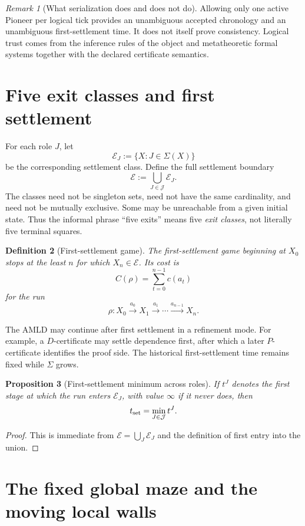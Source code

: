 \documentclass[11pt]{article}
\newtheorem{definition}{Definition}[section]
\newtheorem{proposition}[definition]{Proposition}
\theoremstyle{remark}
\newtheorem{remark}[definition]{Remark}
\newcommand{\Roles}{\mathcal J}
\newcommand{\Exit}{\mathcal E}
\begin{document}
\begin{remark}[What serialization does and does not do]
Allowing only one active Pioneer per logical tick provides an unambiguous accepted chronology and an unambiguous first-settlement time. It does not itself prove consistency. Logical trust comes from the inference rules of the object and metatheoretic formal systems together with the declared certificate semantics.
\end{remark}

\section{Five exit classes and first settlement}

For each role $J$, let
\[
\Exit_J:=\{X:J\in\Sigma(X)\}
\]
be the corresponding settlement class. Define the full settlement boundary
\[
\Exit:=\bigcup_{J\in\Roles}\Exit_J.
\]
The classes need not be singleton sets, need not have the same cardinality, and need not be mutually exclusive. Some may be unreachable from a given initial state. Thus the informal phrase ``five exits'' means five \emph{exit classes}, not literally five terminal squares.

\begin{definition}[First-settlement game]
The first-settlement game beginning at $X_0$ stops at the least $n$ for which $X_n\in\Exit$. Its cost is
\[
C(\rho)=\sum_{t=0}^{n-1}c(a_t)
\]
for the run
\[
\rho:X_0\xrightarrow{a_0}X_1\xrightarrow{a_1}\cdots\xrightarrow{a_{n-1}}X_n.
\]
\end{definition}

The AMLD may continue after first settlement in a refinement mode. For example, a $D$-certificate may settle dependence first, after which a later $P$-certificate identifies the proof side. The historical first-settlement time remains fixed while $\Sigma$ grows.

\begin{proposition}[First-settlement minimum across roles]
If $t^J$ denotes the first stage at which the run enters $\Exit_J$, with value $\infty$ if it never does, then
\[
t_{\rm set}=\min_{J\in\Roles}t^J.
\]
\end{proposition}
\begin{proof}
This is immediate from $\Exit=\bigcup_J\Exit_J$ and the definition of first entry into the union.
\end{proof}

\section{The fixed global maze and the moving local walls}
\end{document}
